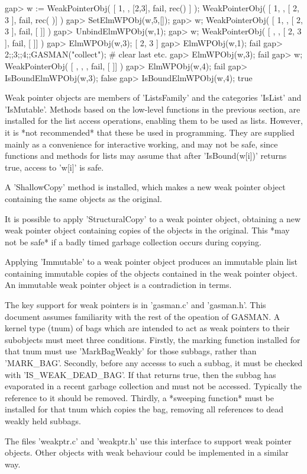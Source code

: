 \begintt
    gap>  w := WeakPointerObj( [ 1, , [2,3], fail, rec() ] );   
    WeakPointerObj( [ 1, , [ 2, 3 ], fail, rec(
       )] )
    gap> SetElmWPObj(w,5,[]);
    gap> w;
    WeakPointerObj( [ 1, , [ 2, 3 ], fail, [  ]] )
    gap> UnbindElmWPObj(w,1);
    gap> w;
    WeakPointerObj( [ , , [ 2, 3 ], fail, [  ]] )
    gap> ElmWPObj(w,3);      
    [ 2, 3 ]
    gap> ElmWPObj(w,1);
    fail
    gap> 2;;3;;4;;GASMAN("collect"); # clear last etc.
    gap> ElmWPObj(w,3);          
    fail
    gap> w;
    WeakPointerObj( [ , , , fail, [  ]] )
    gap> ElmWPObj(w,4);
    fail
    gap> IsBoundElmWPObj(w,3);
    false
    gap> IsBoundElmWPObj(w,4);
    true
\endtt    
    

Weak pointer objects are members of 'ListsFamily' and the categories 'IsList'
and 'IsMutable'.  Methods based  on  the low-level functions in  the previous
section, are  installed for the list  access operations,  enabling them to be
used as lists.    However, it is  *not recommended*  that  these be used   in
programming. They   are  supplied mainly as   a convenience  for  interactive
working, and   may not be   safe, since functions  and methods  for lists may
assume that after 'IsBound(w[i])' returns true, access to 'w[i]' is safe.


A 'ShallowCopy'  method is installed, which  makes a  new weak pointer object
containing the same objects as the original.

It is possible to apply 'StructuralCopy'  to a weak pointer object, obtaining
a new weak  pointer object containing copies of  the objects in the original. 
This *may  not  be safe*  if a  badly timed garbage  collection occurs during
copying.

Applying 'Immutable'  to a weak   pointer object produces an  immutable plain
list containing immutable copies of the objects contained in the weak pointer
object. An immutable weak pointer object is a contradiction in terms.
    

The  key support for  weak  pointers is in   'gasman.c' and 'gasman.h'.  This
document assumes  familiarity  with the rest of  the  opeation of  GASMAN.  A
kernel type (tnum) of   bags which are  intended  to act as weak  pointers to
their  subobjects must meet  three conditions.  Firstly, the marking function
installed for that tnum must  use  'MarkBagWeakly' for those subbags,  rather
than 'MARK_BAG'.  Secondly,  before any accesss to  such a subbag, it must be
checked with 'IS_WEAK_DEAD_BAG'. If that   returns true, then the subbag  has
evaporated in a recent garbage collection and must not be accessed. Typically
the reference to it should be removed. Thirdly, a *sweeping function* must be
installed for that tnum which copies the bag, removing all references to dead
weakly held subbags.

The  files 'weakptr.c' and  'weakptr.h'  use this  interface  to support weak
pointer objects. Other objects with weak behaviour  could be implemented in a
similar way.

    